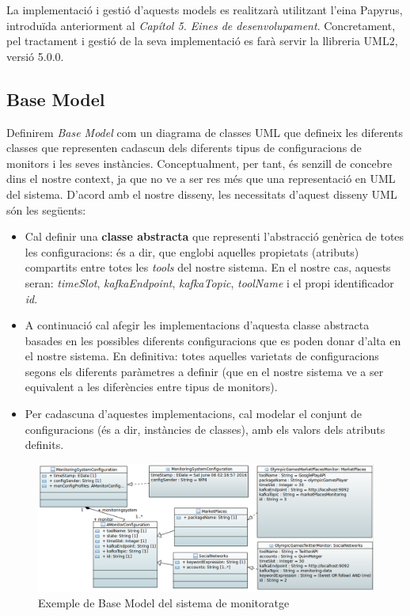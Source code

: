La implementació i gestió d'aquests models es realitzarà utilitzant l'eina Papyrus, introduïda anteriorment al \textit{Capítol 5. Eines de desenvolupament}. Concretament, pel tractament i gestió de la seva implementació es farà servir la llibreria UML2, versió 5.0.0.

\subsection{Base Model}

Definirem \textit{Base Model} com un diagrama de classes UML que defineix les diferents classes que representen cadascun dels diferents tipus de configuracions de monitors i les seves instàncies. Conceptualment, per tant, és senzill de concebre dins el nostre context, ja que no ve a ser res més que una representació en UML del sistema. D'acord amb el nostre disseny, les necessitats d'aquest disseny UML són les següents: 

\begin{itemize}
\item Cal definir una \textbf{classe abstracta} que representi l'abstracció genèrica de totes les configuracions: és a dir, que englobi aquelles propietats (atributs) compartits entre totes les \textit{tools} del nostre sistema. En el nostre cas, aquests seran: \textit{timeSlot}, \textit{kafkaEndpoint}, \textit{kafkaTopic}, \textit{toolName} i el propi identificador \textit{id}.
\item A continuació cal afegir les implementacions d'aquesta classe abstracta basades en les possibles diferents configuracions que es poden donar d'alta en el nostre sistema. En definitiva: totes aquelles varietats de configuracions segons els diferents paràmetres a definir (que en el nostre sistema ve a ser equivalent a les diferències entre tipus de monitors).
\item Per cadascuna d'aquestes implementacions, cal modelar el conjunt de configuracions (és a dir, instàncies de classes), amb els valors dels atributs definits.
\end{itemize}

\begin{figure}
\centering
\includegraphics[width=13cm]{Figures/Figure16}
\decoRule
\caption{Exemple de Base Model del sistema de monitoratge}
\label{fig:Figura16}
\end{figure}

